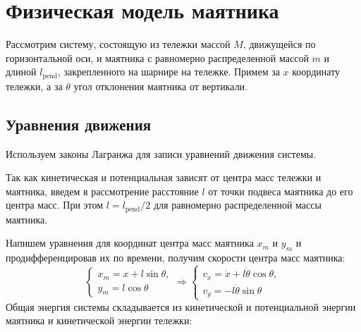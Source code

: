 \section{Физическая модель маятника}

Рассмотрим систему, состоящую из тележки массой $M$, движущейся по горизонтальной оси, и маятника с равномерно распределенной массой $m$ и длиной $l_{\text{pend}}$,
закрепленного на шарнире на тележке. Примем за $x$ координату тележки, а за $\theta$ угол отклонения маятника от вертикали. 

\subsection{Уравнения движения}
Используем законы Лагранжа для записи уравнений движения системы. 

Так как кинетическая и потенциальная зависят от центра масс тележки и маятника, введем в рассмотрение расстояние $l$ 
от точки подвеса маятника до его центра масс. При этом $l = l_{\text{pend}}/2$ для равномерно распределенной массы маятника.

Напишем уравнения для координат центра масс маятника $x_m$ и $y_m$ и продифференцировав их по времени, получим скорости центра масс маятника:
\begin{equation}
    \begin{cases}
        x_m = x + l\sin\theta, \\
        y_m = l\cos\theta
    \end{cases} \Rightarrow
    \begin{cases}
        v_x = \dot{x} + l\dot{\theta}\cos\theta, \\
        v_y = -l\dot{\theta}\sin\theta
    \end{cases}
\end{equation}
Общая энергия системы складывается из кинетической и потенциальной энергии маятника и кинетической энергии тележки:

